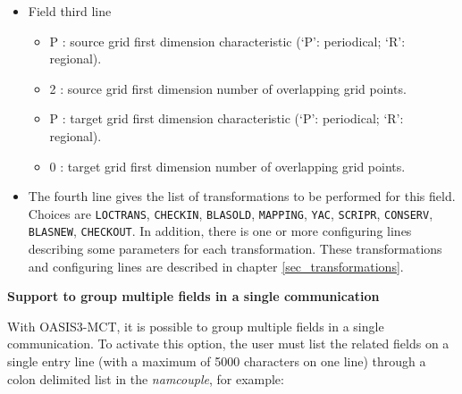 \begin{itemize}
\begin{itemize}
    These source and target grid dimensions are optional but have to be provided
    in order to have 2D fields written as 2D arrays in the debug files;
    otherwise, the fields will be written out as 1D arrays.

  \item toce : prefix of the source grid name in grid data files (see
    section \ref{subsec_griddata}) (80 characters maximum)
  \item atmo : prefix of the target grid name in grid data files (80 characters maximum)
  \item {\tt LAG=+14400}: optional lag index for the field (see section \ref{subsec_lag})
  \item {\tt SEQ=+1}: optional sequence index for the field (see
    section \ref{subsec_sec})
  \end{itemize}
\item Field third line
  \begin{itemize}
  \item P : source grid first dimension characteristic (`P':
    periodical; `R': regional).
  \item 2 : source grid first dimension number of overlapping grid
    points.
  \item P : target grid first dimension characteristic (`P':
    periodical; `R': regional).
  \item 0 : target grid first dimension number of overlapping grid
    points.
  \end{itemize}

\item The fourth line gives the list of transformations to be performed for
this field. Choices are {\tt LOCTRANS}, {\tt CHECKIN},  {\tt BLASOLD}, {\tt  MAPPING}, {\tt YAC}, {\tt SCRIPR}, {\tt CONSERV}, {\tt BLASNEW}, {\tt CHECKOUT}.
In addition, there is one or more configuring lines describing some parameters for each transformation. These transformations and configuring
lines are described in chapter \ref{sec_transformations}.

\end{itemize}

{\bf Support to group multiple fields in a single communication}

With OASIS3-MCT, it is possible to group multiple fields in a
single communication. To activate this option, the user must list the
related fields on a single entry line (with a maximum of 5000 characters on one line) through a colon
delimited list in the {\it namcouple}, for example:

